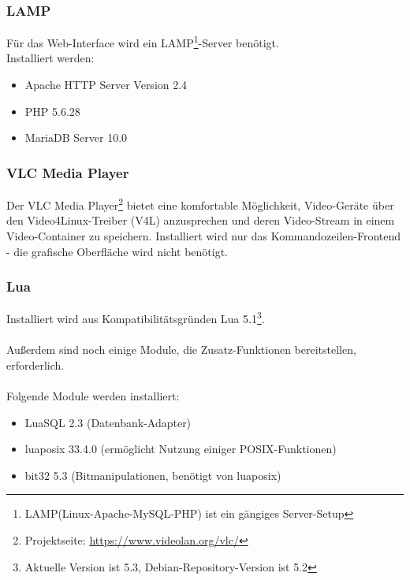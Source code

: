 \subsubsection{LAMP}
F\"ur das Web-Interface wird ein LAMP\footnote{LAMP(Linux-Apache-MySQL-PHP) ist ein gängiges Server-Setup}-Server ben\"otigt.\\
Installiert werden:
\begin{itemize}
    \item Apache HTTP Server Version 2.4
    \item PHP 5.6.28
    \item MariaDB Server 10.0
\end{itemize}
\vspace{0.5cm}
\subsubsection{VLC Media Player}
Der VLC Media Player\footnote{Projektseite: \url{https://www.videolan.org/vlc/}} bietet eine komfortable M\"oglichkeit, Video-Ger\"ate \"uber den Video4Linux-Treiber (V4L) anzusprechen und deren Video-Stream in einem Video-Container zu speichern. Installiert wird nur das Kommandozeilen-Frontend - die grafische Oberfl\"ache wird nicht ben\"otigt.
\\
\subsubsection{Lua}
Installiert wird aus Kompatibilit\"atsgr\"unden Lua 5.1\footnote{Aktuelle Version ist 5.3, Debian-Repository-Version ist 5.2}.\\
\\
Au{\ss}erdem sind noch einige Module, die Zusatz-Funktionen bereitstellen, erforderlich.\\
\\
Folgende Module werden installiert:

\begin{itemize}
    \item LuaSQL 2.3 (Datenbank-Adapter)
    \item luaposix 33.4.0 (erm\"oglicht Nutzung einiger POSIX-Funktionen)
    \item bit32 5.3 (Bitmanipulationen, ben\"otigt von luaposix)
\end{itemize}

\newpage